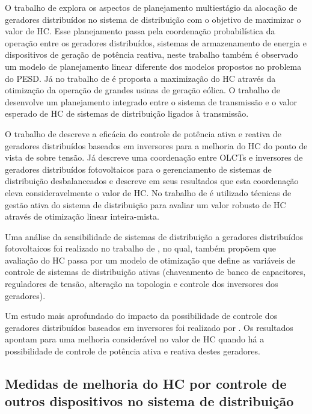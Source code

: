 O trabalho de  explora os aspectos de planejamento multiestágio da alocação de geradores distribuídos no sistema de distribuição com o objetivo de maximizar o valor de HC. Esse planejamento passa pela coordenação probabilística da operação entre os geradores distribuídos, sistemas de armazenamento de energia e dispositivos de geração de potência reativa, neste trabalho também é observado um modelo de planejamento linear diferente dos modelos propostos no problema do \ac{PESD}. Já no trabalho de  é proposta a maximização do HC através da otimização da operação de grandes usinas de geração eólica. O trabalho de  desenvolve um planejamento integrado entre o sistema de transmissão e o valor esperado de HC de sistemas de distribuição ligados à transmissão.

O trabalho de  descreve a eficácia do controle de potência ativa e reativa de geradores distribuídos baseados em inversores para a melhoria do HC do ponto de vista de sobre tensão.  Já  descreve uma coordenação entre \acp{OLCT} e inversores de geradores distribuídos fotovoltaicos para o gerenciamento de sistemas de distribuição desbalanceados e descreve em seus resultados que esta coordenação eleva consideravelmente o valor de HC. No trabalho de  é utilizado técnicas de gestão ativa do sistema de distribuição para avaliar um valor robusto de HC através de otimização linear inteira-mista. 

Uma análise da sensibilidade de sistemas de distribuição a geradores distribuídos fotovoltaicos foi realizado no trabalho de , no qual, também propõem que avaliação do HC passa por um modelo de otimização que define as variáveis de controle de sistemas de distribuição ativas (chaveamento de banco de capacitores, reguladores de tensão, alteração na topologia e controle dos inversores dos geradores).

Um estudo mais aprofundado do impacto da possibilidade de controle dos geradores distribuídos baseados em inversores foi realizado por . Os resultados apontam para uma melhoria considerável no valor de HC quando há a possibilidade de controle de potência ativa e reativa destes geradores.
\vfill

\subsection{Medidas de melhoria do HC por controle de outros dispositivos no sistema de distribuição}

